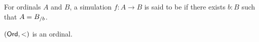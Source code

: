 \documentclass[hott-all.tex]{subfiles}
\begin{document}
% 
% 
\begin{defn}
  For ordinals $A$ and $B$, a simulation $f:A\to B$ is said to be 
  if there exists $b:B$ such that $A = {B}_{/b}$.
\end{defn}
% 
% 
% 
\begin{thm}
  $(\mathsf{Ord},<)$ is an ordinal.
\end{thm}
% 
% 
% 
% 
\end{document}

